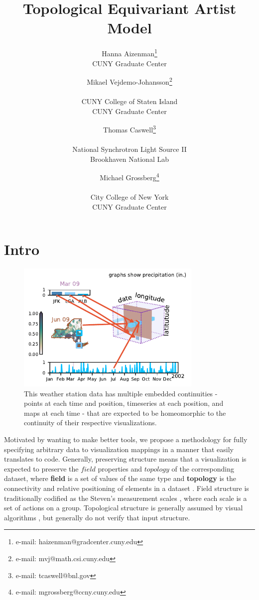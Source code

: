 \documentclass[preprint]{vgtc}
\title{Topological Equivariant Artist Model}
\author{
Hanna Aizenman\thanks{e-mail: haizenman@gradcenter.cuny.edu} \\
\scriptsize{CUNY Graduate Center}
\and
Mikael Vejdemo-Johansson\thanks{e-mail: mvj@math.csi.cuny.edu} \\
\parbox{1.6in}{\scriptsize \centering CUNY College of Staten Island \\
CUNY Graduate Center}
\and
Thomas Caswell\thanks{e-mail: tcaswell@bnl.gov} \\
\parbox{1.8in}{\scriptsize\centering National Synchrotron Light Source II \\ Brookhaven National Lab}
\and
Michael Grossberg\thanks{e-mail: mgrossberg@ccny.cuny.edu} \\
\parbox{1.6in}{\scriptsize\centering City College of New York \\ CUNY Graduate Center}
}
\begin{document}
\maketitle

\section{Intro}
\label{sec:intro}

\begin{figure}
\begin{center}
    \includegraphics[width=3.5in]{k_different_types.pdf}
\end{center}
\caption{This weather station data has multiple embedded continuities - points at each time and position, timeseries at each position, and maps at each time - that are expected to be homeomorphic to the continuity of their respective visualizations.}
    \label{fig:homeomorphism}
\end{figure}
Motivated by wanting to make better tools, we propose a methodology for fully specifying arbitrary data to visualization mappings in a manner that easily translates to code. Generally, preserving structure means that a visualization is expected to preserve the $field$ properties and $topology$ of the corresponding dataset, where \textcolor{fiber}{\textbf{field}} is a set of values of the same type and \textcolor{base}{\textbf{topology}} is the connectivity and relative positioning of elements in a dataset \cite{wilkinsonGrammarGraphics2005}.  Field structure is traditionally codified as the Steven's measurement scales \cite{stevensTheoryScalesMeasurement1946}, where each scale is a set of actions on a group. Topological structure is generally assumed by visual algorithms \cite{chiTaxonomyVisualizationTechniques2000, toryRethinkingVisualizationHighlevel2004}, but generally do not verify that input structure.
\end{document}

